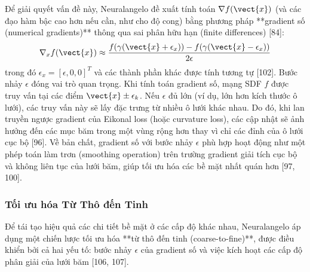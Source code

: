 Để giải quyết vấn đề này, Neuralangelo đề xuất tính toán $\nabla f(\vect{x})$ (và các đạo hàm bậc cao hơn nếu cần, như cho độ cong) bằng phương pháp **gradient số (numerical gradients)** thông qua sai phân hữu hạn (finite differences) [84]:
\begin{equation} \label{eq:numerical_gradient}
\nabla_x f(\vect{x}) \approx \frac{f(\gamma(\vect{x} + \epsilon_x)) - f(\gamma(\vect{x} - \epsilon_x))}{2\epsilon}
\end{equation}
trong đó $\epsilon_x = [\epsilon, 0, 0]^T$ và các thành phần khác được tính tương tự [102]. Bước nhảy $\epsilon$ đóng vai trò quan trọng. Khi tính toán gradient số, mạng SDF $f$ được truy vấn tại các điểm $\vect{x} \pm \epsilon_k$. Nếu $\epsilon$ đủ lớn (ví dụ, lớn hơn kích thước ô lưới), các truy vấn này sẽ lấy đặc trưng từ nhiều ô lưới khác nhau. Do đó, khi lan truyền ngược gradient của Eikonal loss (hoặc curvature loss), các cập nhật sẽ ảnh hưởng đến các mục băm trong một vùng rộng hơn thay vì chỉ các đỉnh của ô lưới cục bộ [96]. Về bản chất, gradient số với bước nhảy $\epsilon$ phù hợp hoạt động như một phép toán làm trơn (smoothing operation) trên trường gradient giải tích cục bộ và không liên tục của lưới băm, giúp tối ưu hóa các bề mặt nhất quán hơn [97, 100].

\subsubsection{Tối ưu hóa Từ Thô đến Tinh}
\label{subsubsec:neuralangelo_coarse_to_fine}

Để tái tạo hiệu quả các chi tiết bề mặt ở các cấp độ khác nhau, Neuralangelo áp dụng một chiến lược tối ưu hóa **từ thô đến tinh (coarse-to-fine)**, được điều khiển bởi cả hai yếu tố: bước nhảy $\epsilon$ của gradient số và việc kích hoạt các cấp độ phân giải của lưới băm [106, 107].

